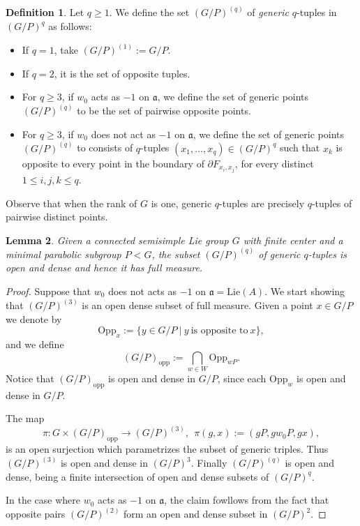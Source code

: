 \documentclass[a4paper]{amsart}
\newtheorem{lem}{Lemma}[section]
\theoremstyle{definition}
\newtheorem{dfn}[lem]{Definition}
\theoremstyle{remark}
\theoremstyle{TheoremNum}
\begin{document}
\begin{dfn}\cite{BucSavProj} \label{Def generic} Let $q\geq 1$. We define the set $(G/P)^{(q)}$ of \emph{generic} $q$-tuples in $(G/P)^q$ as follows: 
 \begin{itemize}
\item If $q=1$, take $(G/P)^{(1)}:=G/P$. 
\item If $q=2$, it is the set of opposite tuples. 
\item For $q\geq 3$, if $w_0$ acts as $-1$ on $\mathfrak{a}$, we define the set of generic points $(G/P)^{(q)}$ to be the set of pairwise opposite points. 
\item For $q\geq 3$, if $w_0$ does not act as $-1$ on $\mathfrak{a}$, we define the set of generic points $(G/P)^{(q)}$ to consists of $q$-tuples $(x_1,\dots,x_q)\in (G/P)^q$ such that $x_k$ is opposite to every point in the boundary of $\partial F_{x_i,x_j}$, for every distinct  $1 \leq i,j,k \leq q$.  
\end{itemize}
\end{dfn}

Observe that when the rank of $G$ is one, generic $q$-tuples are precisely $q$-tuples of pairwise distinct points. 

\begin{lem}\label{lem symmetrically weyl opposite}
Given a connected semisimple Lie group $G$ with finite center and a minimal parabolic subgroup $P<G$, the subset $(G/P)^{(q)}$ of generic $q$-tuples is open and dense and hence it has full measure. 
\end{lem}

\begin{proof}
Suppose that $w_0$ does not acts as $-1$ on $\mathfrak{a}=\mathrm{Lie}(A)$. We start showing that $(G/P)^{(3)}$ is an open dense subset of full measure. Given a point $x \in G/P$ we denote by 
$$
\mathrm{Opp}_x:=\{ y \in G/P \ | \ y \ \text{is opposite to} \ x \},
$$
and we define
$$
(G/P)_{\mathrm{opp}}:=\bigcap_{w \in W} \mathrm{Opp}_{wP}. 
$$
Notice that $(G/P)_{\mathrm{opp}}$ is open and dense in $G/P$, since each $\mathrm{Opp}_w$ is open and dense in $G/P$.  

The map
$$
\pi:G \times (G/P)_{\mathrm{opp}} \longrightarrow (G/P)^{(3)}, \ \ \pi(g,x):=(gP,gw_0P,gx),
$$
is an open surjection which parametrizes the subset of generic triples. Thus $(G/P)^{(3)}$ is open and dense in $(G/P)^3$. Finally $(G/P)^{(q)}$ is open and dense, being a finite intersection of open and dense subsets of $(G/P)^q$.

In the case where $w_0$ acts as $-1$ on $\mathfrak{a}$, the claim fowllows from the fact that opposite pairs $(G/P)^{(2)}$ form an open and dense subset in $(G/P)^2$. 
\end{proof}
\end{document}

